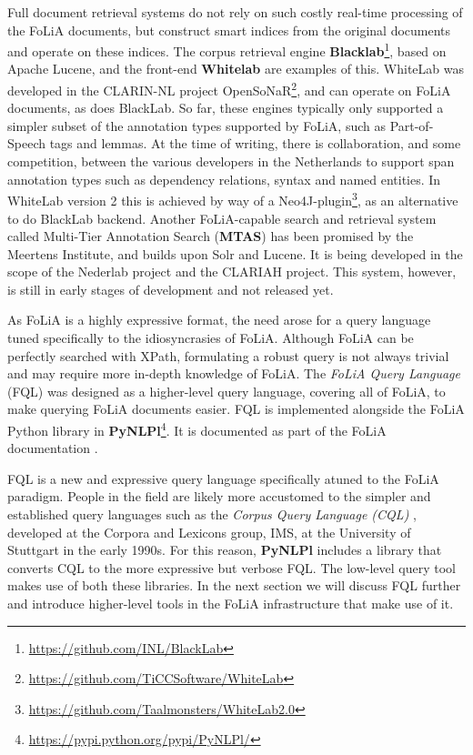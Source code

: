 \documentclass[a4paper,11pt]{article}
\begin{document}
{Full document retrieval systems do not rely on such costly real-time processing
of the FoLiA documents, but construct smart indices from the original documents
and operate on these indices. The corpus retrieval engine
\textbf{Blacklab}\footnote{\url{https://github.com/INL/BlackLab}}, based on
Apache Lucene, and the front-end \textbf{Whitelab}
\cite{ReynaertVandecampVanzaanen2014ColingDemo} are examples of this. WhiteLab
was developed in the CLARIN-NL project
OpenSoNaR\footnote{\url{https://github.com/TiCCSoftware/WhiteLab}}, and can
operate on FoLiA documents, as does BlackLab. So far, these engines typically
only supported a simpler subset of the annotation types supported by FoLiA,
such as Part-of-Speech tags and lemmas.  At the time of writing, there is
collaboration, and some competition, between the various developers in the
Netherlands to support span annotation types such as dependency relations,
syntax and named entities. In WhiteLab version 2 this is achieved by way of a
Neo4J-plugin\footnote{\url{https://github.com/Taalmonsters/WhiteLab2.0}}, as an
alternative to do BlackLab backend. Another FoLiA-capable search and retrieval
system called Multi-Tier Annotation Search (\textbf{MTAS}) has been promised by
the Meertens Institute, and builds upon Solr and Lucene. It is being developed in
the scope of the Nederlab project \cite{Nederlab2016} and the CLARIAH project.
This system, however, is still in early stages of development and not released
yet.


As FoLiA is a highly expressive format, the need arose for a query language
tuned specifically to the idiosyncrasies of FoLiA. Although FoLiA can be
perfectly searched with XPath, formulating a robust query is not always trivial
and may require more in-depth knowledge of FoLiA. The \emph{FoLiA Query
Language} (FQL) was designed as a higher-level query language, covering all of
FoLiA, to make querying FoLiA documents easier. FQL is implemented alongside
the FoLiA Python library in
\textbf{PyNLPl}\footnote{\url{https://pypi.python.org/pypi/PyNLPl/}}. It is documented as part
of the FoLiA documentation \cite{FOLIADOC2014}.

FQL is a new and expressive query language specifically atuned to the FoLiA
paradigm. People in the field are likely more accustomed to the simpler and
established query languages such as the \emph{Corpus Query Language (CQL)}
\cite{CWB-Christ94}, developed at the Corpora and Lexicons group, IMS, at the
University of Stuttgart in the early 1990s. For this reason, \textbf{PyNLPl}
includes a library that converts CQL to the more expressive but verbose FQL.
The low-level query tool makes use of both these libraries. In the next section
we will discuss FQL further and introduce higher-level tools in the FoLiA
infrastructure that make use of it.

}
\end{document}
